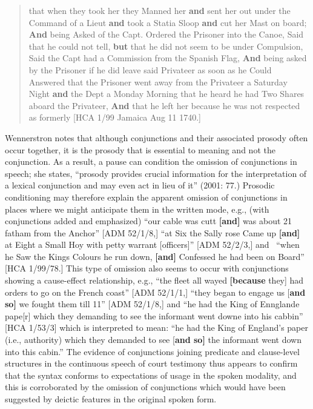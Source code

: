 \begin{quotation}
that when they took her they Manned her \textbf{and} sent her out under the Command of a Lieut \textbf{and} took a Statia Sloop \textbf{and} cut her Mast on board; \textbf{And} being Asked of the Capt. Ordered the Prisoner into the Canoe, Said that he could not tell, \textbf{but} that he did not seem to be under Compulsion, Said the Capt had a Commission from the Spanish Flag, \textbf{And} being asked by the Prisoner if he did leave said Privateer as soon as he Could Answered that the Prisoner went away from the Privateer a Saturday Night\textbf{ and} the Dept a Monday Morning that he heard he had Two Shares aboard the Privateer, \textbf{And} that he left her because he was not respected as formerly [HCA 1/99 Jamaica Aug 11 1740.]

\end{quotation}
\begin{styleStandard}
Wennerstron notes that although conjunctions and their associated prosody often occur together, it is the prosody that is essential to meaning and not the conjunction. As a result, a pause can condition the omission of conjunctions in speech; she states, “prosody provides crucial information for the interpretation of a lexical conjunction and may even act in lieu of it” (2001: 77.) Prosodic conditioning may therefore explain the apparent omission of conjunctions in places where we might anticipate them in the written mode, e.g., (with conjunctions added and emphasized) “our cable was cutt \textbf{[and]} was about 21 fatham from the Anchor” [ADM 52/1/8,] “at Six the Sally rose Came up \textbf{[and]} at Eight a Small Hoy with petty warrant [officers]” [ADM 52/2/3,] and \ “when he Saw the Kings Colours he run down, \textbf{[and]} Confessed he had been on Board” [HCA 1/99/78.] This type of omission also seems to occur with conjunctions showing a cause-effect relationship, e.g., “the fleet all wayed \textbf{[because }they] had orders to go on the French coast” [ADM 52/1/1,] “they began to engage us [\textbf{and so]} we fought them till 11” [ADM 52/1/8,] and “he had the King of Ennglande pape[r] which they demanding to see the informant went downe into his cabbin” [HCA 1/53/3] which is interpreted to mean: “he had the King of England’s paper (i.e., authority) which they demanded to see [\textbf{and so]} the informant went down into this cabin.” The evidence of conjunctions joining predicate and clause-level structures in the continuous speech of court testimony thus appears to confirm that the syntax conforms to expectations of usage in the spoken modality, and this is corroborated by the omission of conjunctions which would have been suggested by deictic features in the original spoken form. 
\end{styleStandard}


